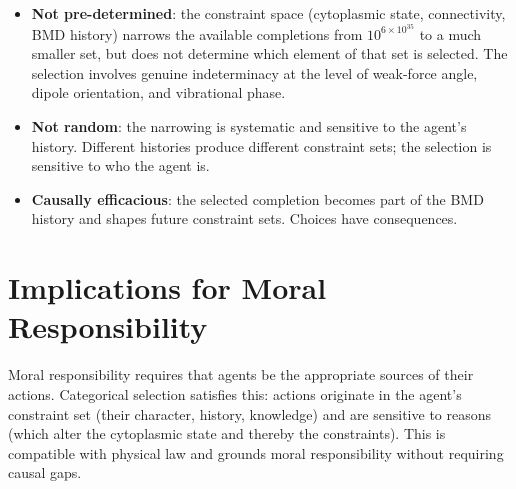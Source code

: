 \begin{itemize}
  \item \textbf{Not pre-determined}: the constraint space (cytoplasmic state, connectivity, BMD history) narrows the available completions from $10^{6 \times 10^{35}}$ to a much smaller set, but does not determine which element of that set is selected. The selection involves genuine indeterminacy at the level of weak-force angle, dipole orientation, and vibrational phase.

  \item \textbf{Not random}: the narrowing is systematic and sensitive to the agent's history. Different histories produce different constraint sets; the selection is sensitive to who the agent is.

  \item \textbf{Causally efficacious}: the selected completion becomes part of the BMD history and shapes future constraint sets. Choices have consequences.
\end{itemize}

\section{Implications for Moral Responsibility}

Moral responsibility requires that agents be the appropriate sources of their actions. Categorical selection satisfies this: actions originate in the agent's constraint set (their character, history, knowledge) and are sensitive to reasons (which alter the cytoplasmic state and thereby the constraints). This is compatible with physical law and grounds moral responsibility without requiring causal gaps.
